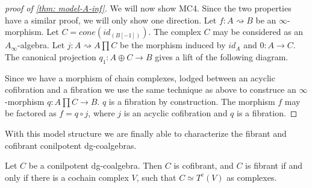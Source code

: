 \documentclass[../thesis.tex]{subfiles}
\begin{document}
\begin{proof}[proof of \ref{thm: model-A-inf}]
            We will now show MC4. Since the two properties have a similar proof, we will only show one direction. Let $f: A \rightsquigarrow B$ be an $\infty$-morphism. Let $C = cone(id_(B[-1]))$. The complex $C$ may be considered as an $A_\infty$-algebra. Let $j : A \rightsquigarrow A\prod C$ be the morphism induced by $id_A$ and $0:A \rightarrow C$. The canonical projection $q_1 : A\oplus C \rightarrow B$ gives a lift of the following diagram.

            \begin{center}
            \end{center}

            Since we have a morphism of chain complexes, lodged between an acyclic cofibration and a fibration we use the same technique as above to construce an $\infty$-morphism $q : A\prod C \rightarrow B$. $q$ is a fibration by construction. The morphism $f$ may be factored as $f = q\circ j$, where $j$ is an acyclic cofibration and $q$ is a fibration.
        \end{proof}

        With this model structure we are finally able to characterize the fibrant and cofibrant conilpotent dg-coalgebras.

        \begin{proposition}
            Let $C$ be a conilpotent dg-coalgebra. Then $C$ is cofibrant, and $C$ is fibrant if and only if there is a cochain complex $V$, such that $C \simeq T^c(V)$ as complexes.
        \end{proposition}
\end{document}
